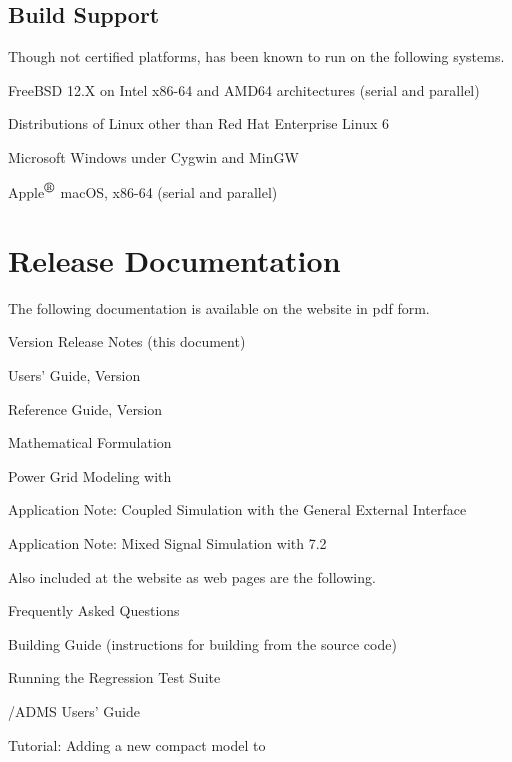 \documentclass[letterpaper]{scrartcl}
\begin{document}
\subsection*{Build Support}
Though not certified platforms, \Xyce{} has been known to run on the following
systems.
\begin{XyceItemize}
  \item FreeBSD 12.X on Intel x86-64 and AMD64 architectures (serial
    and parallel)
  \item Distributions of Linux other than Red Hat Enterprise Linux 6
  \item Microsoft Windows under Cygwin and MinGW
  \item Apple${}^{\mbox{\textregistered}}$ macOS, x86-64 (serial and parallel)
\end{XyceItemize}


\section{\Xyce{} Release \XyceVersionVar{} Documentation}
The following \Xyce{} documentation is available on the \Xyce{} website in pdf
form.
\begin{XyceItemize}
  \item \Xyce{} Version \XyceVersionVar{} Release Notes (this document)
  \item \Xyce{} Users' Guide, Version \XyceVersionVar{}
  \item \Xyce{} Reference Guide, Version \XyceVersionVar{}
  \item \Xyce{} Mathematical Formulation
  \item Power Grid Modeling with \Xyce{}
  \item Application Note: Coupled Simulation with the \Xyce{} General
    External Interface
  \item Application Note: Mixed Signal Simulation with \Xyce{} 7.2
\end{XyceItemize}
Also included at the \Xyce{} website as web pages are the following.
\begin{XyceItemize}
  \item Frequently Asked Questions
  \item Building Guide (instructions for building \Xyce{} from the source code)
  \item Running the \Xyce{} Regression Test Suite
  \item \Xyce{}/ADMS Users' Guide
  \item Tutorial:  Adding a new compact model to \Xyce{}
\end{XyceItemize}
\end{document}
